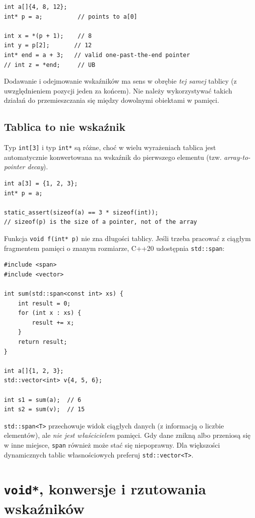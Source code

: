 \begin{lstlisting}
int a[]{4, 8, 12};
int* p = a;          // points to a[0]

int x = *(p + 1);    // 8
int y = p[2];       // 12
int* end = a + 3;   // valid one-past-the-end pointer
// int z = *end;     // UB
\end{lstlisting}

Dodawanie i odejmowanie wskaźników ma sens w obrębie \emph{tej samej}
tablicy (z uwzględnieniem pozycji jeden za końcem). Nie należy
wykorzystywać takich działań do przemieszczania się między dowolnymi
obiektami w pamięci.

\subsection{Tablica to nie wskaźnik}

Typ \texttt{int[3]} i typ \texttt{int*} są różne, choć w wielu
wyrażeniach tablica jest automatycznie konwertowana na wskaźnik
do pierwszego elementu (tzw. \emph{array-to-pointer decay}).

\begin{lstlisting}
int a[3] = {1, 2, 3};
int* p = a;

static_assert(sizeof(a) == 3 * sizeof(int));
// sizeof(p) is the size of a pointer, not of the array
\end{lstlisting}

Funkcja \texttt{void f(int* p)} nie zna długości tablicy.
Jeśli trzeba pracować z ciągłym fragmentem pamięci o znanym
rozmiarze, C++20 udostępnia \texttt{std::span}:

\begin{lstlisting}
#include <span>
#include <vector>

int sum(std::span<const int> xs) {
    int result = 0;
    for (int x : xs) {
        result += x;
    }
    return result;
}

int a[]{1, 2, 3};
std::vector<int> v{4, 5, 6};

int s1 = sum(a);  // 6
int s2 = sum(v);  // 15
\end{lstlisting}

\texttt{std::span<T>} przechowuje widok ciągłych danych
(z informacją o liczbie elementów), ale \emph{nie jest właścicielem}
pamięci. Gdy dane znikną albo przeniosą się w inne miejsce,
\texttt{span} również może stać się niepoprawny. Dla większości
dynamicznych tablic własnościowych preferuj \texttt{std::vector<T>}.

\section{\texttt{void*}, konwersje i rzutowania wskaźników}

